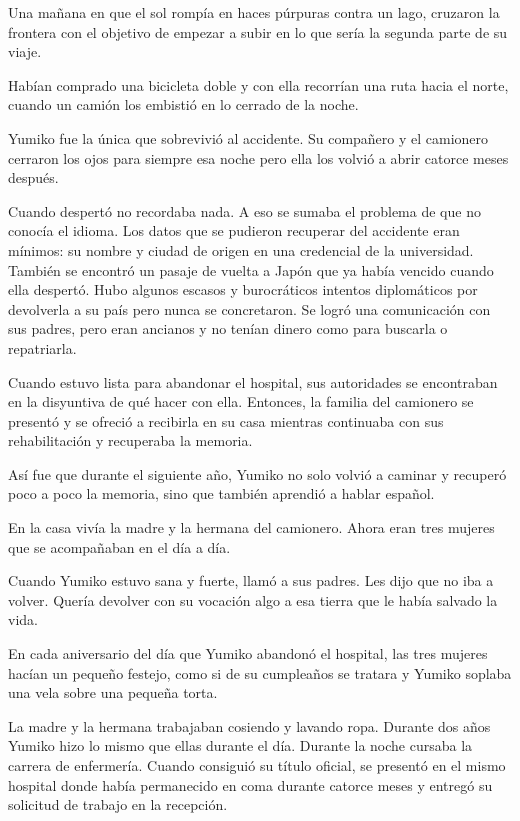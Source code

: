 \documentclass[12pt,twoside,openright]{book}
\begin{document}
Una mañana en que el sol rompía en haces púrpuras contra un lago, cruzaron la frontera con el objetivo de empezar a subir en lo que sería la segunda parte de su viaje.

Habían comprado una bicicleta doble y con ella recorrían una ruta hacia el norte, cuando un camión los embistió en lo cerrado de la noche.

Yumiko fue la única que sobrevivió al accidente. Su compañero y el camionero cerraron los ojos para siempre esa noche pero ella los volvió a abrir catorce meses después.

Cuando despertó no recordaba nada. A eso se sumaba el problema de que no conocía el idioma. Los datos que se pudieron recuperar del accidente eran mínimos: su nombre y ciudad de origen en una credencial de la universidad. También se encontró un pasaje de vuelta a Japón que ya había vencido cuando ella despertó. Hubo algunos escasos y burocráticos intentos diplomáticos por devolverla a su país pero nunca se concretaron. Se logró una comunicación con sus padres, pero eran ancianos y no tenían dinero como para buscarla o repatriarla.

Cuando estuvo lista para abandonar el hospital, sus autoridades se encontraban en la disyuntiva de qué hacer con ella. Entonces, la familia del camionero se presentó y se ofreció a recibirla en su casa mientras continuaba con sus rehabilitación y recuperaba la memoria.

Así fue que durante el siguiente año, Yumiko no solo volvió a caminar y recuperó poco a poco la memoria, sino que también aprendió a hablar español.

En la casa vivía la madre y la hermana del camionero. Ahora eran tres mujeres que se acompañaban en el día a día.

Cuando Yumiko estuvo sana y fuerte, llamó a sus padres. Les dijo que no iba a volver. Quería devolver con su vocación algo a esa tierra que le había salvado la vida.

En cada aniversario del día que Yumiko abandonó el hospital, las tres mujeres hacían un pequeño festejo, como si de su cumpleaños se tratara y Yumiko soplaba una vela sobre una pequeña torta.

La madre y la hermana trabajaban cosiendo y lavando ropa. Durante dos años Yumiko hizo lo mismo que ellas durante el día. Durante la noche cursaba la carrera de enfermería. Cuando consiguió su título oficial, se presentó en el mismo hospital donde había permanecido en coma durante catorce meses y entregó su solicitud de trabajo en la recepción.
\end{document}
